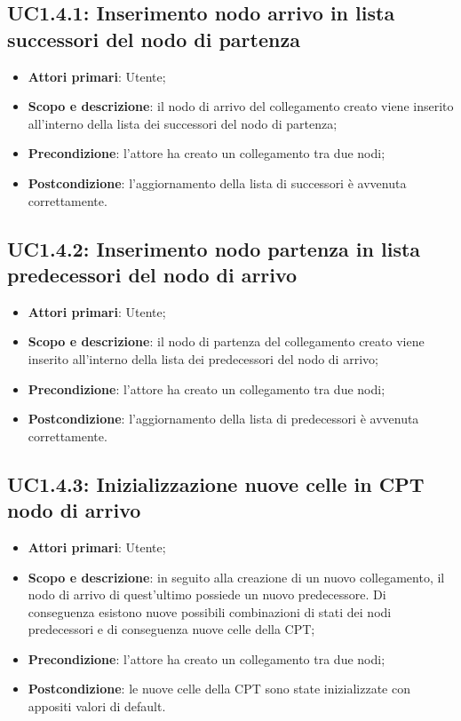 \subsection{UC1.4.1: Inserimento nodo arrivo in lista successori del nodo di partenza} 
\hypertarget{UC1.4.1}{} 
\begin{itemize} 
	\item{\textbf{Attori primari}: Utente;} 
	\item{\textbf{Scopo e descrizione}: il nodo di arrivo del collegamento creato viene inserito all'interno della lista dei successori del nodo di partenza;} 
	\item{\textbf{Precondizione}: l'attore ha creato un collegamento tra due nodi;} 
	\item{\textbf{Postcondizione}: l'aggiornamento della lista di successori è avvenuta correttamente.} 
\end{itemize} 
\subsection{UC1.4.2: Inserimento nodo partenza in lista predecessori del nodo di arrivo} 
\hypertarget{UC1.4.2}{} 
\begin{itemize} 
	\item{\textbf{Attori primari}: Utente;} 
	\item{\textbf{Scopo e descrizione}: il nodo di partenza del collegamento creato viene inserito all'interno della lista dei predecessori del nodo di arrivo;} 
	\item{\textbf{Precondizione}: l'attore ha creato un collegamento tra due nodi;} 
	\item{\textbf{Postcondizione}: l'aggiornamento della lista di predecessori è avvenuta correttamente.} 
\end{itemize} 
\subsection{UC1.4.3: Inizializzazione nuove celle in CPT nodo di arrivo} 
\hypertarget{UC1.4.3}{} 
\begin{itemize} 
	\item{\textbf{Attori primari}: Utente;} 
	\item{\textbf{Scopo e descrizione}: in seguito alla creazione di un nuovo collegamento, il nodo di arrivo di quest'ultimo possiede un nuovo predecessore. Di conseguenza esistono nuove possibili combinazioni di stati dei nodi predecessori e di conseguenza nuove celle della CPT;} 
	\item{\textbf{Precondizione}: l'attore ha creato un collegamento tra due nodi;} 
	\item{\textbf{Postcondizione}: le nuove celle della CPT sono state inizializzate con appositi valori di default.} 
\end{itemize} 
